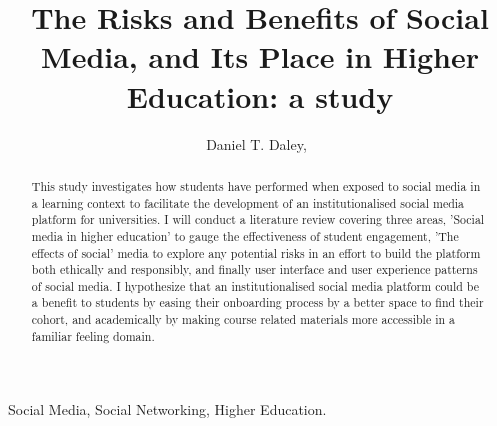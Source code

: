\documentclass[lettersize,journal]{IEEEtran}
\begin{document}
\title{The Risks and Benefits of Social Media, and Its Place in Higher Education: a study}

\author{Daniel T. Daley,~}




\maketitle
\begin{abstract}
	This study investigates how students have performed when exposed to social media in
	a learning context to facilitate the development of an institutionalised social media platform for
	universities. I will conduct a literature review covering three areas, 'Social media in higher education'
	to gauge the effectiveness of student engagement, 'The effects of social' media to explore any potential
	risks in an effort to build the platform both ethically and responsibly, and finally user interface and
	user experience patterns of social media. I hypothesize that an institutionalised social media platform
	could be a benefit to students by easing their onboarding process by a better space to find their cohort,
	and academically by making course related materials more accessible in a familiar feeling domain. 
\end{abstract}

\begin{IEEEkeywords}
Social Media, Social Networking, Higher Education.
\end{IEEEkeywords}
\end{document}
